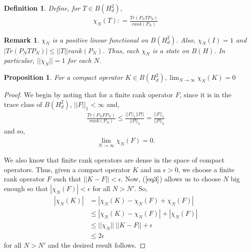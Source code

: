 \documentclass[article]{amsart}
\newtheorem{proposition}        [theorem]{Proposition}
\newtheorem{definition}[theorem]{Definition}
\newtheorem{remark}{Remark}
\begin{document}
\begin{definition}
Define, for $T \in B(H_d^2)$,
\begin{align*}
\chi_N (T) : = \frac{Tr(P_NTP_N)}{rank(P_N)}
\end{align*}
\end{definition}
\begin{remark}
$\chi_N$ is a positive linear functional on $B(H^2_d)$. Also, $\chi_N(I)=1$ and $|Tr(P_NT P_N)| \leq ||T|| rank(P_N)$. Thus, each $\chi_N$ is a state on $B(H)$.  In particular, $||\chi_N||= 1$ for each $N$.
\end{remark}
\begin{proposition}\label{eq19}
For a compact operator $K \in B(H_d^2),  \lim_{N\rightarrow \infty} \chi_N(K)=0$
\end{proposition}
\begin{proof}
We begin by noting that for a finite rank operator $F$, since it is in the trace class of $B(H^2_d)$, $||F||_1 < \infty$ and,
\begin{align}
    \frac{Tr(P_NFP_N)}{rank(P_N)} \leq \frac{||F||_1 ||P||}{||P||_2}  = \frac{||F||_1}{||P||_2} 
\end{align}
and so,
\begin{align}\label{eq3}
    \lim_{N \rightarrow \infty} \chi_N(F)=0.
\end{align}

We also know that finite rank operators are dense in the space of compact operators. Thus, given a compact operator $K$ and an $\epsilon>0$, we choose a finite rank operator $F$ such that $||K-F||< \epsilon$. Now, ($\ref{eq3}$) allows us to choose $N$ big enough so that $|\chi_N(F)|<\epsilon$ for all $N >N'$. So,
\begin{align*}
   | \chi_N(K) | &= |\chi_N(K) - \chi_N(F) +\chi_N(F)|\\ 
   & \leq |\chi_N(K) - \chi_N(F)| + |\chi_N(F)|\\
   & \leq ||\chi_N|| \ ||K-F|| + \epsilon\\
   & \leq 2 \epsilon
\end{align*}
for all $N> N'$ and the desired result follows.
\end{proof}
\end{document}
